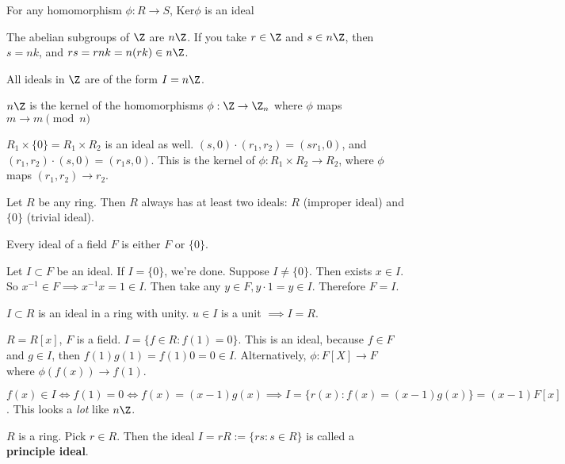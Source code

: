 \documentclass[twoside, 10pt]{article}
\newcommand{\Ker}{\text{Ker}}
\begin{document}
\begin{cor}
    For any homomorphism $\phi: R\to S$, $\Ker\phi$ is an ideal
\end{cor}

\begin{exm*}
    The abelian subgroups of $\Z$ are $n\Z$. If you take $r \in \Z$ and $s \in n\Z$, then $s = nk$, and $rs = rnk = n(rk) \in n\Z$.
\end{exm*}

\begin{cor}
    All ideals in $\Z$ are of the form $I = n\Z$.
\end{cor}

$n\Z$ is the kernel of the homomorphisms $\phi: \Z \to \Z_n$ where $\phi$ maps $m \to m\pmod{n}$

\begin{exm*}
    $R_1 \times \{0\}= R_1 \times R_2$ is an ideal as well. $(s, 0)\cdot (r_1, r_2) = (sr_1, 0)$, and $(r_1, r_2)\cdot (s, 0) = (r_1s, 0)$. This is the kernel of $\phi: R_1 \times R_2 \to R_2$, where $\phi$ maps $(r_1, r_2) \to r_2$. 
\end{exm*}

Let $R$ be any ring. Then $R$ always has at least two ideals: $R$ (improper ideal) and $\{0\}$ (trivial ideal).

\begin{rmk}
    Every ideal of a field $F$ is either $F$ or $\{0\}$.
\end{rmk}
Let $I \subset F$ be an ideal. If $I = \{0\}$, we're done. Suppose $I \neq \{0\}$. Then exists $x\in I$. So $x^{-1} \in F \implies x^{-1}x = 1 \in I$. Then take any $y \in F, y \cdot 1 = y \in I$. Therefore $F = I$.

\begin{cor}
    $I \subset R$ is an ideal in a ring with unity. $u\in I$ is a unit $\implies I = R$.
\end{cor}

\begin{exm*}
    $R = R[x]$, $F$ is a field. $I = \{f \in R: f(1) = 0\}$. This is an ideal, because $f\in F$ and $g\in I$, then $f(1)g(1) = f(1)0 = 0 \in I$. Alternatively, $\phi: F[X] \to F$ where $\phi(f(x)) \to f(1)$.
\end{exm*}
$f(x) \in I \iff f(1) = 0 \iff f(x) = (x-1)g(x) \implies I = \{r(x) : f(x) = (x-1)g(x)\} = (x-1)F[x]$. This looks a \emph{lot} like $n\Z$. 

\begin{defn}
    $R$ is a ring. Pick $r \in R$. Then the ideal $I = rR := \{rs: s \in R\}$ is called a \textbf{principle ideal}.
\end{defn}
\end{document}
